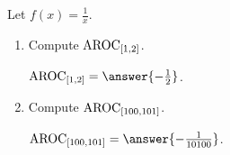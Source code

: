 \documentclass{ximera}
\author{Kenneth Berglund}
\begin{document}
\licenseSZ
\begin{exercise}

Let $f(x) = \frac{1}{x}$.

\begin{enumerate}
\item Compute $\mathrm{AROC}_{[1, 2]}$.

$\av_{[1, 2]} = \answer{-\frac{1}{2}}$.  

\item Compute $\mathrm{AROC}_{[100, 101]}$.

$\av_{[100, 101]} = \answer{-\frac{1}{10100}}$.

	
\end{enumerate}

\end{exercise}
\end{document}
